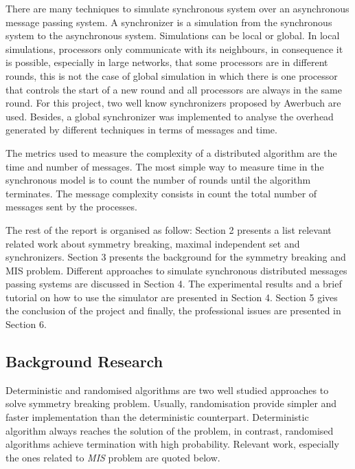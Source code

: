 There are many techniques to simulate synchronous system over an asynchronous message passing system. A synchronizer is a simulation from the synchronous system to the asynchronous system. Simulations can be local or global. In local simulations, processors only communicate with its neighbours, in consequence it is possible, especially in large networks, that some processors are in different rounds, this is not the case of global simulation in which there is one processor that controls the start of a new round and all processors are always in the same round. For this project, two well know synchronizers proposed by Awerbuch \cite{awerbuch1985complexity} are used. Besides, a global synchronizer was implemented to analyse the overhead generated by different techniques in terms of messages and time. 


The metrics used to measure the complexity of a distributed algorithm are the time and number of messages. The most simple way to measure time in the synchronous model is to count the number of rounds until the algorithm terminates. The message complexity consists in count the total number of messages sent by the processes. 

The rest of the report is organised as follow: Section 2 presents a list relevant related work about symmetry breaking, maximal independent set and synchronizers. Section 3 presents the background for the symmetry breaking and MIS problem. Different approaches to simulate synchronous distributed messages passing systems are discussed in Section 4. The experimental results and a brief tutorial on how to use the simulator are presented in Section 4. Section 5 gives the conclusion of the project and finally, the professional issues are presented in Section 6. 

\subsection{Background Research}
 
Deterministic and randomised algorithms are two well studied approaches to solve symmetry breaking problem. Usually, randomisation provide simpler and faster implementation than the deterministic counterpart. Deterministic algorithm always reaches the solution of the problem, in contrast, randomised algorithms achieve termination with high probability. Relevant work, especially the ones related to \textit{MIS} problem are quoted below.

